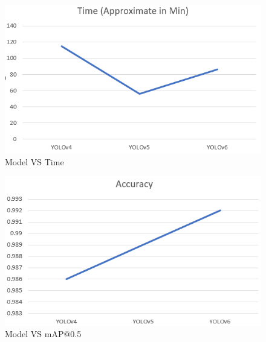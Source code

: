 \begin{figure}[H]
    \centering
    \includegraphics[scale=1]{55_chapter_5/g1.png}
    \caption{Model VS Time}
    \label{Graph}
\end{figure}
\begin{figure}[H]
    \centering
    \includegraphics[scale=1]{55_chapter_5/g2.png}
    \caption{Model VS mAP@0.5}
    \label{Graph}
\end{figure}